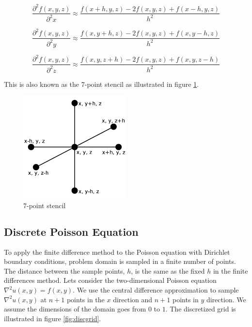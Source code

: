 $$\frac{\partial^2 f(x, y, z)}{\partial^2 x} \approx \frac{f(x+h, y, z) - 2f(x, y, z) + f(x-h, y, z)}{h^2}$$

$$\frac{\partial^2 f(x, y, z)}{\partial^2 y} \approx \frac{f(x, y+h, z) - 2f(x, y, z) + f(x, y-h, z)}{h^2}$$

$$\frac{\partial^2 f(x, y, z)}{\partial^2 z} \approx \frac{f(x, y, z+h) - 2f(x, y, z) + f(x, y, z-h)}{h^2}$$

This is also known as the 7-point stencil as illustrated in figure \ref{fig:7ps}.

\begin{figure}[ht]
	\center
	\includegraphics[width=0.5\textwidth]{images/7_point_stencil}
	\caption{7-point stencil}
	\label{fig:7ps}
\end{figure}

\subsection{Discrete Poisson Equation}

To apply the finite difference method to the Poisson equation with Dirichlet 
boundary conditions, problem domain is sampled in a finite number of points. 
The distance between the sample points, $h$, is the same as the fixed $h$ in the finite
differences method. Lets consider the two-dimensional Poisson equation $\nabla^2
u(x, y) = f(x, y)$. We use the central difference approximation to sample
$\nabla^2 u(x, y)$ at $n+1$ points in the $x$ direction and $n+1$ points in $y$
direction. We assume the dimensions of the domain goes from $0$ to $1$. The discretized 
grid is illustrated in figure \ref{fig:discgrid}.

